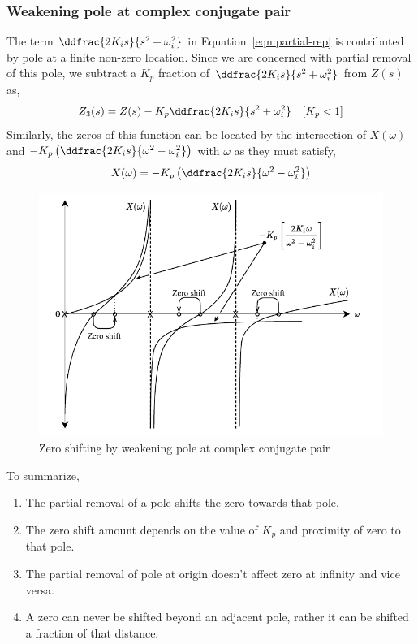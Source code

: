 \subsubsection*{Weakening pole at complex conjugate pair}
The term $\ddfrac{2K_is}{s^2+\omega_i^2}$ in Equation~\ref{eqn:partial-rep} is contributed by pole at a finite non-zero location. Since we are concerned with partial removal of this pole, we subtract a $K_p$ fraction of $\ddfrac{2K_is}{s^2+\omega_i^2}$ from $Z(s)$ as,
\begin{equation*}
    Z_3(s)=Z(s)-K_p\ddfrac{2K_is}{s^2+\omega_i^2} \quad [K_p<1]
\end{equation*}
Similarly, the zeros of this function can be located by the intersection of $X(\omega)$ and $-K_p\left(\ddfrac{2K_is}{\omega^2-\omega_i^2}\right)$ with $\omega$ as they must satisfy,
\begin{equation*}
    X(\omega)=-K_p\left(\ddfrac{2K_is}{\omega^2-\omega_i^2}\right)
\end{equation*}
\begin{figure}[H]
    \centering
    \includegraphics{../Figures/zero_shifting_by_weakening_pole_at_finite}
    \caption{Zero shifting by weakening pole at complex conjugate pair}
    \label{fig:pole-fin}
\end{figure}
To summarize,
\begin{enumerate}
    \item The partial removal of a pole shifts the zero towards that pole.
    \item The zero shift amount depends on the value of $K_p$ and proximity of zero to that pole.
    \item The partial removal of pole at origin doesn't affect zero at infinity and vice versa.
    \item A zero can never be shifted beyond an adjacent pole, rather it can be shifted a fraction of that distance.
\end{enumerate}